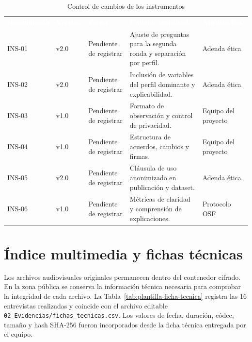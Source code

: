 \documentclass[12pt,a4paper]{article}
\begin{document}
\begin{table}[H]
\centering
\caption{Control de cambios de los instrumentos}
\label{tab:versiones-instrumentos}
\small
{}
\begin{tabularx}{\textwidth}{L{1.70cm} L{1.60cm} L{2.55cm} Y L{2.40cm}}
\textcolor{white}{\textbf{Instrumento}} &
\textcolor{white}{\textbf{Versión}} &
\textcolor{white}{\textbf{Fecha}} &
\textcolor{white}{\textbf{Cambio principal}} &
\textcolor{white}{\textbf{Aprobación}}\\
INS-01 & v2.0 & Pendiente de registrar & Ajuste de preguntas para la segunda ronda y separación por perfil. & Adenda ética\\
INS-02 & v2.0 & Pendiente de registrar & Inclusión de variables del perfil dominante y explicabilidad. & Adenda ética\\
INS-03 & v1.0 & Pendiente de registrar & Formato de observación y control de privacidad. & Equipo del proyecto\\
INS-04 & v1.0 & Pendiente de registrar & Estructura de acuerdos, cambios y firmas. & Equipo del proyecto\\
INS-05 & v2.0 & Pendiente de registrar & Cláusula de uso anonimizado en publicación y dataset. & Adenda ética\\
INS-06 & v1.0 & Pendiente de registrar & Métricas de claridad y comprensión de explicaciones. & Protocolo OSF\\
\end{tabularx}
\end{table}

\section{Índice multimedia y fichas técnicas}
\label{ap:multimedia}

Los archivos audiovisuales originales permanecen dentro del contenedor cifrado. En la zona pública se conserva la información técnica necesaria para comprobar la integridad de cada archivo. La Tabla~\ref{tab:plantilla-ficha-tecnica} registra las 16 entrevistas realizadas y coincide con el archivo editable \nolinkurl{02_Evidencias/fichas_tecnicas.csv}. Los valores de fecha, duración, códec, tamaño y hash SHA-256 fueron incorporados desde la ficha técnica entregada por el equipo.
\end{document}
